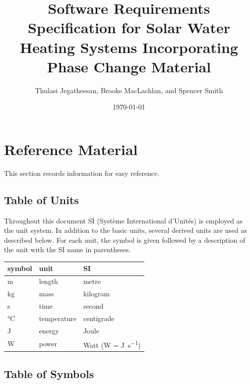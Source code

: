 \documentclass[12pt]{article}
\begin{document}
\title{Software Requirements Specification for Solar Water Heating Systems
  Incorporating Phase Change Material} 
\author{Thulasi Jegatheesan, Brooks MacLachlan, and Spencer Smith}
\date{\today}
	
\maketitle

\tableofcontents

\section{Reference Material}

This section records information for easy reference.

\subsection{Table of Units}

Throughout this document SI (Syst\`{e}me International d'Unit\'{e}s) is employed
as the unit system.  In addition to the basic units, several derived units are
used as described below.  For each unit, the symbol is given followed by a
description of the unit with the SI name in parentheses.
~\newline

\renewcommand{\arraystretch}{1.2}
  \noindent \begin{tabular}{l l l} 
    \toprule		
    \textbf{symbol} & \textbf{unit} & \textbf{SI}\\
    \midrule 
    \si{\metre} & length & metre\\
    \si{\kilogram} & mass	& kilogram\\
    \si{\second} & time & second\\
    \si{\celsius} & temperature & centigrade\\
    \si{\joule} & energy & Joule\\
    \si{\watt} & power & Watt (W = \si{\joule\per\second})\\
    \bottomrule
  \end{tabular}

\subsection{Table of Symbols}
\end{document}
